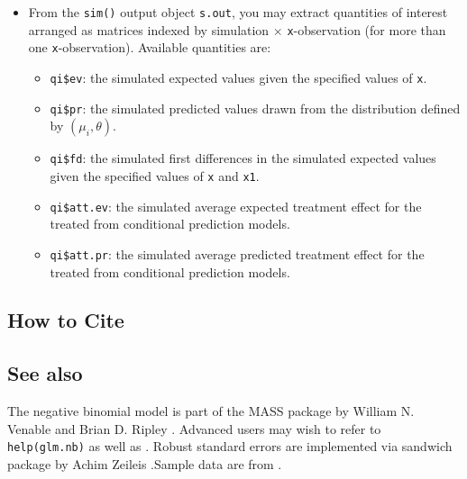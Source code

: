 \begin{itemize}
\item From the {\tt sim()} output object {\tt s.out}, you may extract
  quantities of interest arranged as matrices indexed by simulation
  $\times$ {\tt x}-observation (for more than one {\tt x}-observation).
  Available quantities are:

   \begin{itemize}
   \item {\tt qi\$ev}: the simulated expected values given the specified
     values of {\tt x}.
   \item {\tt qi\$pr}: the simulated predicted values drawn from the
     distribution defined by $(\mu_i, \theta)$.  
   \item {\tt qi\$fd}: the simulated first differences in the
     simulated expected values given the specified values of {\tt x}
     and {\tt x1}.
   \item {\tt qi\$att.ev}: the simulated average expected treatment
     effect for the treated from conditional prediction models.  
   \item {\tt qi\$att.pr}: the simulated average predicted treatment
     effect for the treated from conditional prediction models.  
   \end{itemize}
\end{itemize}

\subsection* {How to Cite} 




\subsection* {See also}
The negative binomial model is part of the MASS package by William N. Venable and Brian D. Ripley \citep{VenRip02}. Advanced users may wish to refer to \texttt{help(glm.nb)} as well as \cite{McCNel89}. Robust standard errors are implemented via sandwich package by Achim Zeileis \citep{Zeileis04}.Sample data are from \cite{Martin92}.
